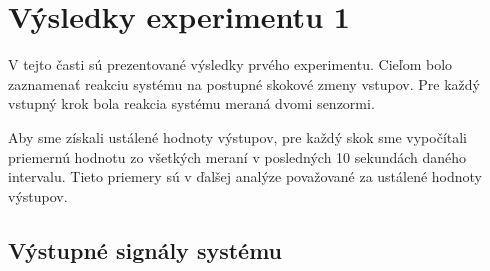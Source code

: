 \documentclass[a4paper, 10pt, ]{article}
\begin{document}
\begin{center}
    \vbox{%
        \label{fig_exp1}
    }%
\end{center}

\begin{center}
    \vbox{%
        \label{fig_exp2}
    }%
\end{center}

\begin{center}
    \vbox{%
        \label{fig_exp3}
    }%
\end{center}


\newpage
\section{Výsledky experimentu 1}

\noindent
V tejto časti sú prezentované výsledky prvého experimentu. 
Cieľom bolo zaznamenať reakciu systému na postupné skokové zmeny vstupov. 
Pre každý vstupný krok bola reakcia systému meraná dvomi senzormi. 

\medskip

\noindent
Aby sme získali ustálené hodnoty výstupov, 
pre každý skok sme vypočítali priemernú hodnotu zo všetkých meraní 
v posledných 10 sekundách daného intervalu. 
Tieto priemery sú v ďalšej analýze považované za ustálené hodnoty výstupov. 

\subsection*{Výstupné signály systému}

\begin{center}
    \vbox{%
        \label{fig_exp1_sen1}
    }%
\end{center}
\end{document}
